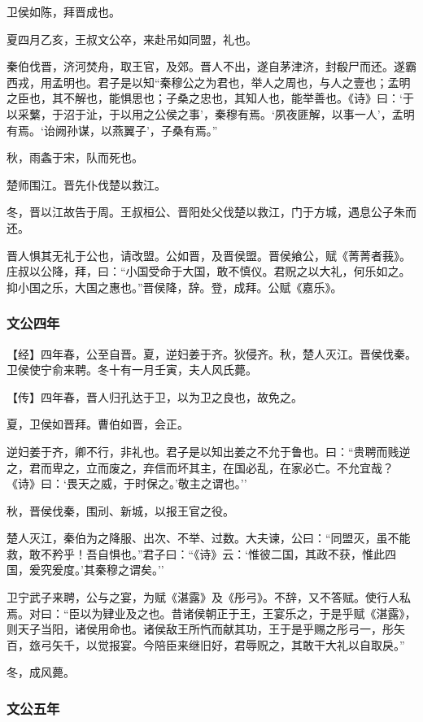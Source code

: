 \documentclass[]{article}
\begin{document}
卫侯如陈，拜晋成也。

夏四月乙亥，王叔文公卒，来赴吊如同盟，礼也。

秦伯伐晋，济河焚舟，取王官，及郊。晋人不出，遂自茅津济，封殽尸而还。遂霸西戎，用孟明也。君子是以知``秦穆公之为君也，举人之周也，与人之壹也；孟明之臣也，其不解也，能惧思也；子桑之忠也，其知人也，能举善也。《诗》曰：`于以采蘩，于沼于沚，于以用之公侯之事'，秦穆有焉。`夙夜匪解，以事一人'，孟明有焉。`诒阙孙谋，以燕翼子'，子桑有焉。''

秋，雨螽于宋，队而死也。

楚师围江。晋先仆伐楚以救江。

冬，晋以江故告于周。王叔桓公、晋阳处父伐楚以救江，门于方城，遇息公子朱而还。

晋人惧其无礼于公也，请改盟。公如晋，及晋侯盟。晋侯飨公，赋《菁菁者莪》。庄叔以公降，拜，曰：``小国受命于大国，敢不慎仪。君贶之以大礼，何乐如之。抑小国之乐，大国之惠也。''晋侯降，辞。登，成拜。公赋《嘉乐》。

\hypertarget{header-n1089}{%
\subsubsection{文公四年}\label{header-n1089}}

【经】四年春，公至自晋。夏，逆妇姜于齐。狄侵齐。秋，楚人灭江。晋侯伐秦。卫侯使宁俞来聘。冬十有一月壬寅，夫人风氏薨。

【传】四年春，晋人归孔达于卫，以为卫之良也，故免之。

夏，卫侯如晋拜。曹伯如晋，会正。

逆妇姜于齐，卿不行，非礼也。君子是以知出姜之不允于鲁也。曰：``贵聘而贱逆之，君而卑之，立而废之，弃信而坏其主，在国必乱，在家必亡。不允宜哉？《诗》曰：`畏天之威，于时保之。'敬主之谓也。''

秋，晋侯伐秦，围刓、新城，以报王官之役。

楚人灭江，秦伯为之降服、出次、不举、过数。大夫谏，公曰：``同盟灭，虽不能救，敢不矜乎！吾自惧也。''君子曰：``《诗》云：`惟彼二国，其政不获，惟此四国，爰究爰度。'其秦穆之谓矣。''

卫宁武子来聘，公与之宴，为赋《湛露》及《彤弓》。不辞，又不答赋。使行人私焉。对曰：``臣以为肄业及之也。昔诸侯朝正于王，王宴乐之，于是乎赋《湛露》，则天子当阳，诸侯用命也。诸侯敌王所忾而献其功，王于是乎赐之彤弓一，彤矢百，玈弓矢千，以觉报宴。今陪臣来继旧好，君辱贶之，其敢干大礼以自取戾。''

冬，成风薨。

\hypertarget{header-n1100}{%
\subsubsection{文公五年}\label{header-n1100}}
\end{document}
